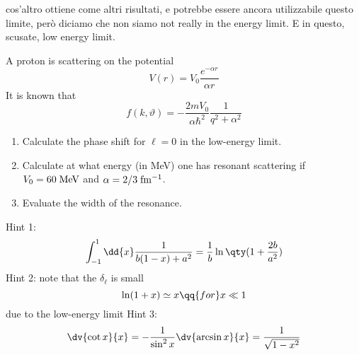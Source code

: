 \begin{soluzione}
{cos'altro ottiene come altri risultati, e potrebbe essere ancora utilizzabile questo limite, però diciamo che non siamo not really in the energy limit. E in questo, scusate, low energy limit.
   }
\end{soluzione}

\newpage
\setcounter{equation}{0}

\begin{esercizio}
   A proton is scattering on the potential
   \begin{equation*}
      V(r)=V_0 \frac{e^{-\alpha r}}{\alpha r}
   \end{equation*}
   It is known that
   \begin{equation*}
      f(k, \vartheta)
      =-\frac{2m V_0}{\alpha \hbar^2} \frac{1}{q^2 + \alpha^2}
   \end{equation*}
   \begin{enumerate}[label=\alph*), leftmargin=0.6cm]
      \item Calculate the phase shift for $\ell=0$ in the low-energy limit.
      \item Calculate at what energy (in MeV) one has resonant scattering if $V_0=60 \rm \; MeV$ and $\alpha=2/3 \rm \; fm^{-1}$.
      \item Evaluate the width of the resonance.
   \end{enumerate}
   Hint 1:
   \begin{equation*}
      \int_{-1}^{1} \dd{x} \frac{1}{b(1-x) + a^2}
      =\frac{1}{b} \ln\qty( 1 + \frac{2b}{a^2} )
   \end{equation*}
   Hint 2: note that the $\delta_{\ell}$ is small
   \begin{equation*}
      \ln( 1 + x )
      \simeq x
      \qq{for}
      x \ll 1
   \end{equation*}
   due to the low-energy limit
   Hint 3:
   \begin{equation*}
      \dv{\cot{x}}{x}
      =-\frac{1}{\sin^2{x}} \dv{\arcsin{x}}{x}
      =\frac{1}{\sqrt{1 - x^2}}
   \end{equation*}
\end{esercizio}
